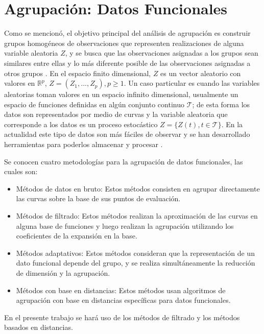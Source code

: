 \documentclass[
]{book}
\begin{document}
\hypertarget{agrupaciuxf3n-datos-funcionales}{%
\section{Agrupación: Datos Funcionales}\label{agrupaciuxf3n-datos-funcionales}}

Como se mencionó, el objetivo principal del análisis de agrupación es construir grupos homogéneos de observaciones que representen realizaciones de alguna variable aleatoria \(Z\), y se busca que las observaciones asignadas a los grupos sean similares entre ellas y lo más diferente posible de las observaciones asignadas a otros grupos \citep{joan}. En el espacio finito dimensional, \(Z\) es un vector aleatorio con valores en \(\mathbb{R}^p\), \(Z=(Z_1,...,Z_p), p\geq 1\). Un caso particular es cuando las variables aleatorias toman valores en un espacio infinito dimensional, usualmente un espacio de funciones definidas en algún conjunto continuo \(\mathcal{T}\); de esta forma los datos son representados por medio de curvas y la variable aleatoria que corresponde a los datos es un proceso estocástico \(Z=\{Z(t),t \in \mathcal{T}\}\). En la actualidad este tipo de datos son más fáciles de observar y se han desarrollado herramientas para poderlos almacenar y procesar \citep{Jaque}.

Se conocen cuatro metodologías para la agrupación de datos funcionales, las cuales son:

\begin{itemize}
\item
  Métodos de datos en bruto: Estos métodos consisten en agrupar directamente las curvas sobre la base de sus puntos de evaluación.
\item
  Métodos de filtrado: Estos métodos realizan la aproximación de las curvas en alguna base de funciones y luego realizan la agrupación utilizando los coeficientes de la expansión en la base.
\item
  Métodos adaptativos: Estos métodos consideran que la representación de un dato funcional depende del grupo, y se realiza simultáneamente la reducción de dimensión y la agrupación.
\item
  Métodos con base en distancias: Estos métodos usan algoritmos de agrupación con base en distancias específicas para datos funcionales.
\end{itemize}

En el presente trabajo se hará uso de los métodos de filtrado y los métodos basados en distancias.
\end{document}
